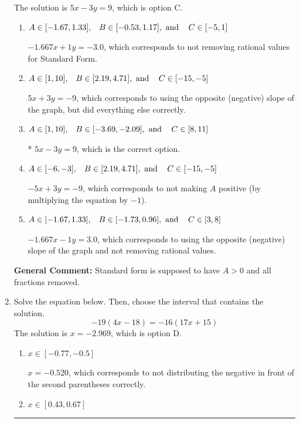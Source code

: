 \documentclass{extbook}[14pt]
\newcommand{\litem}[1]{\item #1

\rule{\textwidth}{0.4pt}}
\begin{document}
\begin{enumerate}
{The solution is \( 5x - 3y = 9 \), which is option C.\begin{enumerate}[label=\Alph*.]
\item \( A \in [-1.67, 1.33], \hspace{3mm} B \in [-0.53, 1.17], \text{ and } \hspace{3mm} C \in [-5, 1] \)

 $-1.667x + 1y = -3.0$, which corresponds to not removing rational values for Standard Form.
\item \( A \in [1, 10], \hspace{3mm} B \in [2.19, 4.71], \text{ and } \hspace{3mm} C \in [-15, -5] \)

 $5x + 3y = -9$, which corresponds to using the opposite (negative) slope of the graph, but did everything else correctly.
\item \( A \in [1, 10], \hspace{3mm} B \in [-3.69, -2.09], \text{ and } \hspace{3mm} C \in [8, 11] \)

* $5x - 3y = 9$, which is the correct option.
\item \( A \in [-6, -3], \hspace{3mm} B \in [2.19, 4.71], \text{ and } \hspace{3mm} C \in [-15, -5] \)

 $-5x + 3y = -9$, which corresponds to not making $A$ positive (by multiplying the equation by $-1$).
\item \( A \in [-1.67, 1.33], \hspace{3mm} B \in [-1.73, 0.96], \text{ and } \hspace{3mm} C \in [3, 8] \)

 $-1.667x - 1y = 3.0$, which corresponds to using the opposite (negative) slope of the graph and not removing rational values.
\end{enumerate}

\textbf{General Comment:} Standard form is supposed to have $A > 0$ and all fractions removed.
}
\litem{
Solve the equation below. Then, choose the interval that contains the solution.
\[ -19(4x -18) = -16(17x + 15) \]The solution is \( x = -2.969 \), which is option D.\begin{enumerate}[label=\Alph*.]
\item \( x \in [-0.77, -0.5] \)

$x = -0.520$, which corresponds to not distributing the negative in front of the second parentheses correctly.
\item \( x \in [0.43, 0.67] \)


\end{enumerate}}
\end{enumerate}
\end{document}
